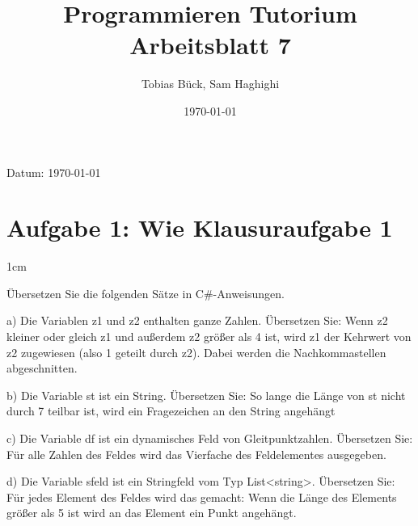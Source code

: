 \documentclass[12pt]{article}
\renewcommand{\maketitle}{
    \begin{center}
        {\LARGE \bfseries \thetitle \par}
        \vspace{0.25em}
        {\small Datum: \today \par}
        \vspace{0.5em}
    \end{center}
}
\newenvironment{aufgabe}[2]
  {%
   \section*{Aufgabe #1: #2}
   \vspace{0.5em}
   \begin{adjustwidth}{1cm}{}  %
  }
  {%
   \end{adjustwidth}
  }
\newcommand{\subaufgabe}[1]{
    #1
}
\begin{document}
\title{Programmieren Tutorium \\ \large Arbeitsblatt 7}
\author{Tobias Bück, Sam Haghighi}
\date{\today}
\maketitle

\begin{aufgabe}{1}{Wie Klausuraufgabe 1}
Übersetzen Sie die folgenden Sätze in C\#-Anweisungen.

\subaufgabe{a)
Die Variablen z1 und z2 enthalten ganze Zahlen. Übersetzen Sie: Wenn z2 kleiner oder gleich
z1 und außerdem z2 größer als 4 ist, wird z1 der Kehrwert von z2 zugewiesen (also 1 geteilt durch z2). Dabei werden die Nachkommastellen abgeschnitten.}

\subaufgabe{b)
Die Variable st ist ein String. Übersetzen Sie: So lange die Länge von st nicht durch 7
teilbar ist, wird ein Fragezeichen an den String angehängt
}

\subaufgabe{c)
Die Variable df ist ein dynamisches Feld von Gleitpunktzahlen. Übersetzen Sie: Für alle
Zahlen des Feldes wird das Vierfache des Feldelementes ausgegeben.
}

\subaufgabe{d)
Die Variable sfeld ist ein Stringfeld vom Typ List<string>. Übersetzen Sie: Für jedes
Element des Feldes wird das gemacht: Wenn die Länge des Elements größer als 5 ist wird an das Element ein Punkt angehängt.
}
\end{aufgabe}
\end{document}
